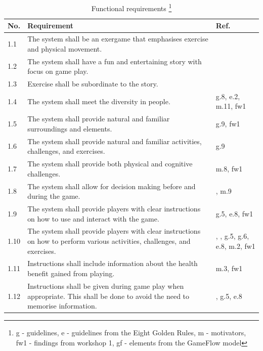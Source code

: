 \begin{minipage}{12 cm}
\begin{table} [H]
\centering
\begin{tabular}{|>{\raggedright}p{}|p{}|p{}|}
\hline
\textbf{No.} & \textbf{Requirement} &  \textbf{Ref.}\\ \hline
1.1 & The system shall be an exergame that emphasises exercise and physical movement. & \cite{project} \\ \hline
1.2 & The system shall have a fun and entertaining story with focus on game play.  & \cite{project} \cite{zyda2005visual} \\ \hline
1.3 & Exercise shall be subordinate to the story. & \cite{zyda2005visual} \\ \hline
1.4 & The system shall meet the diversity in people. & g.8, e.2, m.11, fw1 \\ \hline
1.5 & The system shall provide natural and familiar surroundings and elements. & g.9, fw1\\ \hline
1.6 & The system shall provide natural and familiar activities, challenges, and exercises. & g.9 \\ \hline
1.7 & The system shall provide both physical and cognitive challenges. & m.8, fw1 \\ \hline
1.8 & The system shall allow for decision making before and during the game. & \cite{understandingvg}, m.9 \\ \hline
1.9 & The system shall provide players with clear instructions on how to use and interact with the game. & g.5, e.8, fw1 \\ \hline
1.10 & The system shall provide players with clear instructions on how to perform various activities, challenges, and exercises. & \cite{sweetser}, \cite{project}, g.5, g.6, e.8, m.2, fw1\\ \hline
1.11 & Instructions shall include information about the health benefit gained from playing. & m.3, fw1\\ \hline
1.12 & Instructions shall be given during game play when appropriate. This shall be done to avoid the need to memorise information. & \cite{sweetser}, g.5, e.8 \\ \hline
    \end{tabular}
    \caption[Functional requirements, part 1]{Functional requirements \footnote{g - guidelines, e - guidelines from the Eight Golden Rules, m - motivators, fw1 - findings from workshop 1, gf - elements from the GameFlow model}}
    \label{tab:func1}
\end{table} 
\end{minipage}

